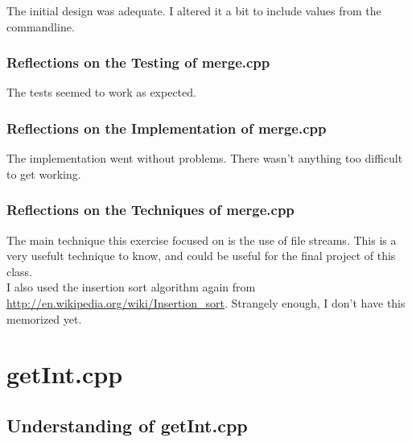 \documentclass[11pt, oneside]{memoir}
\begin{document}
The initial design was adequate.  I altered it a bit to include values
from the commandline.

\subsubsection{Reflections on the Testing of merge.cpp}

The tests seemed to work as expected.



\subsubsection{Reflections on the Implementation of merge.cpp}

The implementation went without problems.  There wasn't anything too
difficult to get working. 


\subsubsection{Reflections on the Techniques of merge.cpp}

The main technique this exercise focused on is the use of file
streams.  This is a very usefult technique to know, and could be
useful for the final project of this class. \\

I also used the insertion sort algorithm again from
\url{http://en.wikipedia.org/wiki/Insertion_sort}.  Strangely enough,
I don't have this memorized yet.


\section{getInt.cpp}

\subsection{Understanding of getInt.cpp}
\end{document}
